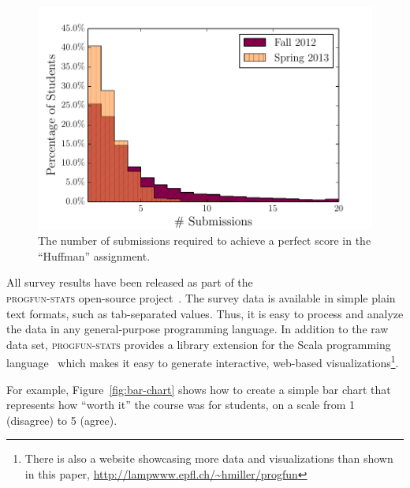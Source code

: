 \documentclass{sig-alternate}
\begin{document}
\begin{figure}[ht!]
  \centering
  \includegraphics[width=\columnwidth]{plots/top-scores-submissions-histogram.pdf}
  \vspace{-0.7cm}
  \caption{The number of submissions required to achieve a perfect score in the ``Huffman'' assignment.}
  \label{fig:top-scores-submissions}
\end{figure}

All survey results have been released as part of the\\ \textsc{progfun-stats} open-source
project~\cite{progfun-stats}. The survey data is available in simple
plain text formats, such  as tab-separated values. Thus, it is easy to process
and analyze the data in any general-purpose programming language. In addition
to the raw data set, \textsc{progfun-stats} provides a library extension for
the Scala programming language~\cite{Odersky-Spoon-Venners07} which makes it
easy to generate interactive, web-based visualizations\footnote{There is also a website showcasing more data and visualizations than shown in this paper, \url{http://lampwww.epfl.ch/~hmiller/progfun}}.

For example, Figure~\ref{fig:bar-chart} shows how to create a simple bar chart
that represents how ``worth it'' the course was for students, on a scale from
1 (disagree) to 5 (agree).


\end{document}
